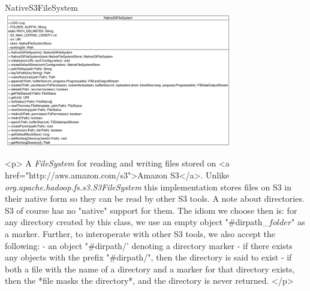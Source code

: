 \begin{XeClass}{NativeS3FileSystem}
\includegraphics[width=10cm]{cdig/NativeS3FileSystem.png}
     
 <p>
 A \emph{FileSystem} for reading and writing files stored on
 <a href="http://aws.amazon.com/s3">Amazon S3</a>.
 Unlike \emph{org.apache.hadoop.fs.s3.S3FileSystem} this implementation
 stores files on S3 in their
 native form so they can be read by other S3 tools.
 A note about directories. S3 of course has no "native" support for them.
 The idiom we choose then is: for any directory created by this class,
 we use an empty object "#{dirpath}_$folder$" as a marker.
 Further, to interoperate with other S3 tools, we also accept the following:
 - an object "#{dirpath}/' denoting a directory marker
 - if there exists any objects with the prefix "#{dirpath}/", then the
 directory is said to exist
 - if both a file with the name of a directory and a marker for that
 directory exists, then the *file masks the directory*, and the directory
 is never returned.
 </p>



\end{XeClass}
